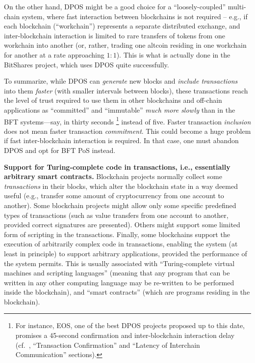 \documentclass[12pt,oneside]{article}
\def\makepoint#1{\medbreak\noindent{\bf #1.\ }}
\def\nxsubpoint{\refstepcounter{subsubsection}%
  \smallbreak\makepoint{\thesubsubsection}}
\def\embt(#1.){\textbf{#1.}}
\begin{document}
On the other hand, DPOS might be a good choice for a
``loosely-coupled'' multi-chain system, where fast interaction between
blockchains is not required -- e.g., if each blockchain
(``workchain'') represents a separate distributed exchange, and
inter-blockchain interaction is limited to rare transfers of tokens
from one workchain into another (or, rather, trading one altcoin
residing in one workchain for another at a rate approaching
$1:1$). This is what is actually done in the BitShares project, which
uses DPOS quite successfully.

To summarize, while DPOS can {\em generate\/} new blocks and {\em
  include transactions\/} into them {\em faster\/} (with smaller
intervals between blocks), these transactions reach the level of trust
required to use them in other blockchains and off-chain applications
as ``committed'' and ``immutable'' {\em much more slowly\/} than in
the BFT systems---say, in thirty seconds%
\footnote{For instance, EOS, one of the best DPOS projects proposed up
  to this date, promises a 45-second confirmation and inter-blockchain
  interaction delay (cf.~\cite{EOSWP}, ``Transaction Confirmation''
  and ``Latency of Interchain Communication'' sections).}
instead of five. Faster transaction {\em inclusion\/} does not mean
faster transaction {\em commitment}. This could become a huge problem
if fast inter-blockchain interaction is required. In that case, one
must abandon DPOS and opt for BFT PoS instead.

\nxsubpoint\label{sp:smartc.supp} \embt(Support for Turing-complete
code in transactions, i.e., essentially arbitrary smart contracts.)
Blockchain projects normally collect some {\em transactions\/} in
their blocks, which alter the blockchain state in a way deemed useful
(e.g., transfer some amount of cryptocurrency from one account to
another). Some blockchain projects might allow only some specific
predefined types of transactions (such as value transfers from one
account to another, provided correct signatures are presented). Others
might support some limited form of scripting in the
transactions. Finally, some blockchains support the execution of
arbitrarily complex code in transactions, enabling the system (at
least in principle) to support arbitrary applications, provided the
performance of the system permits. This is usually associated with
``Turing-complete virtual machines and scripting languages'' (meaning
that any program that can be written in any other computing language
may be re-written to be performed inside the blockchain), and ``smart
contracts'' (which are programs residing in the blockchain).
\end{document}
